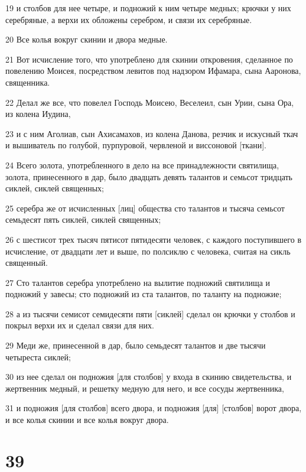 \par 19 и столбов для нее четыре, и подножий к ним четыре медных; крючки у них серебряные, а верхи их обложены серебром, и связи их серебряные.
\par 20 Все колья вокруг скинии и двора медные.
\par 21 Вот исчисление того, что употреблено для скинии откровения, сделанное по повелению Моисея, посредством левитов под надзором Ифамара, сына Ааронова, священника.
\par 22 Делал же все, что повелел Господь Моисею, Веселеил, сын Урии, сына Ора, из колена Иудина,
\par 23 и с ним Аголиав, сын Ахисамахов, из колена Данова, резчик и искусный ткач и вышиватель по голубой, пурпуровой, червленой и виссоновой [ткани].
\par 24 Всего золота, употребленного в дело на все принадлежности святилища, золота, принесенного в дар, было двадцать девять талантов и семьсот тридцать сиклей, сиклей священных;
\par 25 серебра же от исчисленных [лиц] общества сто талантов и тысяча семьсот семьдесят пять сиклей, сиклей священных;
\par 26 с шестисот трех тысяч пятисот пятидесяти человек, с каждого поступившего в исчисление, от двадцати лет и выше, по полсиклю с человека, считая на сикль священный.
\par 27 Сто талантов серебра употреблено на вылитие подножий святилища и подножий у завесы; сто подножий из ста талантов, по таланту на подножие;
\par 28 а из тысячи семисот семидесяти пяти [сиклей] сделал он крючки у столбов и покрыл верхи их и сделал связи для них.
\par 29 Меди же, принесенной в дар, было семьдесят талантов и две тысячи четыреста сиклей;
\par 30 из нее сделал он подножия [для столбов] у входа в скинию свидетельства, и жертвенник медный, и решетку медную для него, и все сосуды жертвенника,
\par 31 и подножия [для столбов] всего двора, и подножия [для] [столбов] ворот двора, и все колья скинии и все колья вокруг двора.

\chapter{39}

